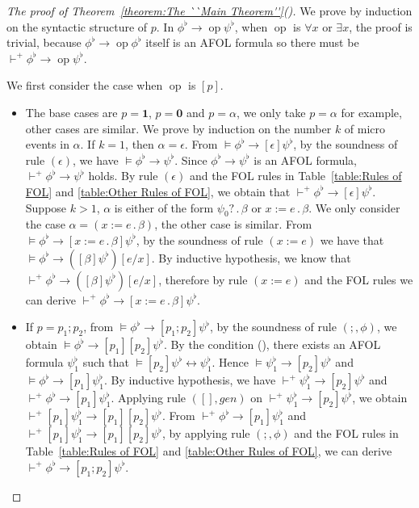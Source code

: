 \documentclass{fcs}
\newcommand{\rmn}[1]{(\romannumeral#1)}
\newcommand{\noth}[0]{\mathbf{1}}
\newcommand{\halt}[0]{\mathbf{0}}
\DeclareMathOperator{\seq}{;}
\DeclareMathOperator{\nex}{.}
\newcommand{\reld}[0]{\mathit{\vdash^+}}
\begin{document}
\begin{proof}[The proof of Theorem~\ref{theorem:The ``Main Theorem''}\rmn{2}]
We prove by induction on the syntactic structure of $p$.
In $\phi^\flat\to \mathop{op} \psi^\flat$, when $\mathop{op}$ is $\forall x$ or $\exists x$, the proof is trivial, because $\phi^\flat\to \mathop{op} \phi^\flat$ itself is an AFOL formula so there must be $\reld \phi^\flat\to \mathop{op} \psi^\flat$.

We first consider the case when $\mathop{op}$ is $[p]$.

\begin{itemize}
    \item The base cases are $p=\noth$, $p=\halt$ and $p=\alpha$, we only take $p=\alpha$ for example, other cases are similar.
    We prove by induction on the number $k$ of micro events in $\alpha$. If $k=1$, then $\alpha = \epsilon$. From $\models \phi^\flat\to [\epsilon]\psi^\flat$, by the soundness of rule $(\epsilon)$,
    we have $\models \phi^\flat \to \psi^\flat$.
    Since $\phi^\flat \to \psi^\flat$ is an AFOL formula, $\reld \phi^\flat \to \psi^\flat$ holds.
    By rule $(\epsilon)$ and the FOL rules in Table~\ref{table:Rules of FOL} and \ref{table:Other Rules of FOL}, we obtain that $\reld \phi^\flat\to [\epsilon]\psi^\flat$.
    Suppose $k>1$, $\alpha$ is either of the form $\psi_0?\nex \beta$ or $x:=e\nex \beta$. We only consider the case $\alpha = (x:=e\nex \beta)$, the other case is similar.
    From $\models \phi^\flat\to [x:=e\nex \beta]\psi^\flat$, by the soundness of rule $(x:=e)$ we have that $\models \phi^\flat\to ([\beta]\psi^\flat)[e/x]$.
    By inductive hypothesis, we know that $\reld \phi^\flat\to ([\beta]\psi^\flat)[e/x]$, therefore by rule $(x:=e)$ and the FOL rules we can derive $\reld \phi^\flat\to [x:=e\nex \beta]\psi^\flat$.

    \item If $p=p_1\seq p_2$, from $\models \phi^\flat\to [p_1;p_2]\psi^\flat$, by the soundness of rule $(\seq, \phi)$, we obtain $\models \phi^\flat\to [p_1][p_2]\psi^\flat$.
    By the condition \rmn{1}, there exists an AFOL formula $\psi^\flat_1$ such that $\models [p_2]\psi^\flat \leftrightarrow \psi^\flat_1$.
    Hence $\models \psi^\flat_1\to [p_2]\psi^\flat$ and $\models \phi^\flat\to [p_1]\psi^\flat_1$. By inductive hypothesis, we have $\reld \psi^\flat_1\to [p_2]\psi^\flat$ and $\reld \phi^\flat\to [p_1]\psi^\flat_1$.
    Applying rule $([], \mathit{gen})$ on $\reld \psi^\flat_1\to [p_2]\psi^\flat$, we obtain $\reld [p_1]\psi^\flat_1\to [p_1][p_2]\psi^\flat$.
    From $\reld \phi^\flat\to [p_1]\psi^\flat_1$ and $\reld [p_1]\psi^\flat_1\to [p_1][p_2]\psi^\flat$, by applying rule $(\seq, \phi)$ and the FOL rules in Table~\ref{table:Rules of FOL} and \ref{table:Other Rules of FOL},
    we can derive $\reld \phi^\flat\to [p_1\seq p_2]\psi^\flat$.


\end{itemize}
\end{proof}
\end{document}
